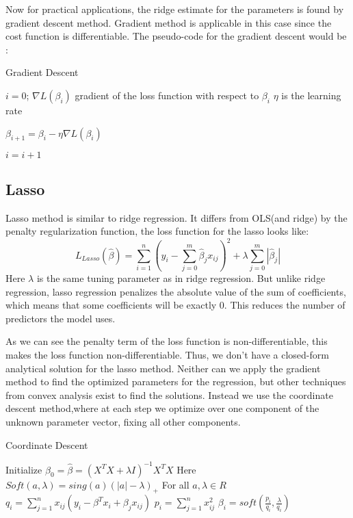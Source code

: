 \documentclass{article}
\begin{document}
Now for practical applications, the ridge estimate for the parameters is found by gradient descent method. Gradient method is applicable in this case since the cost function is differentiable.
The pseudo-code for the gradient descent would be :

\begin{algorithm}
\caption{Gradient Descent}\label{alg:cap}
\begin{algorithmic}
\State $i = 0$;
\State $\nabla L(\beta_i)$ gradient of the loss function with respect to $\beta_i$
\State $\eta$ is the learning rate

    \State $\beta_{i+1}=\beta_i-\eta \nabla L(\beta_i)$

    \State $i=i+1$

\end{algorithmic}
\end{algorithm}



\subsection*{Lasso}
Lasso method is similar to ridge regression. It differs from OLS(and ridge) by the penalty regularization function, the loss function for the lasso looks like:
\begin{displaymath} 
L_{Lasso}(\hat{\beta})=\sum_{i=1}^{n}{(y_i-\sum_{j=0}^{m}{\hat{\beta}_j x_{i j} })^2} + \lambda\sum_{j=0}^{m}{|\hat{\beta}_j|}
\end{displaymath}
Here $\lambda$ is the same tuning parameter as in ridge regression. But unlike ridge regression, lasso regression penalizes the absolute value of the sum of coefficients, which means that some coefficients will be exactly 0. This reduces the number of predictors the model uses.

As we can see the penalty term of the loss function is non-differentiable, this makes the loss function non-differentiable. Thus, we don't have a closed-form analytical solution for the lasso method.
Neither can we apply the gradient method to find the optimized parameters for the regression, but other techniques from convex analysis exist to find the solutions. Instead we use the coordinate descent method,where at each step we optimize over one component of the unknown parameter vector, fixing all other components. 
\begin{algorithm}[H]%
\caption{Coordinate Descent}\label{alg:cap}
\State Initialize $\beta_0=\hat{\beta}=(X^{T}X+\lambda I)^{-1}X^TX $
\State Here $Soft(a,\lambda)=sing(a)(|a|-\lambda)_+$ For all $a,\lambda\in R$ 
\Repeat
{}
    \State $q_i=\sum_{j=1}^{n}{x_{i j}(y_i-\beta^T x_i + \beta_j x_{ij})}$
    \State $p_i=\sum_{j=1}^{n}{x_{ij}^2}$
    \State $\beta_i=soft(\frac{p_i}{q_i},\frac{\lambda}{q_i})$
\EndFor{}
\end{algorithm}
\end{document}
